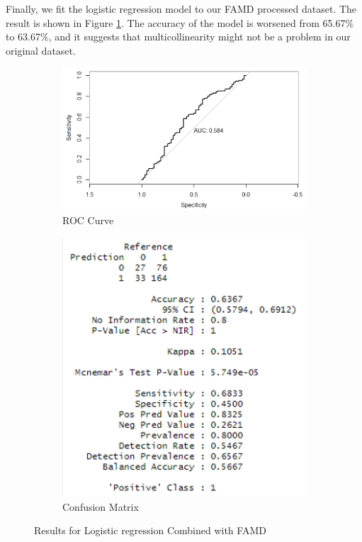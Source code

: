 \documentclass{jpp}
\begin{document}
Finally, we fit the logistic regression model to our FAMD processed dataset. The result is shown in Figure \ref{logistic_FAMD}. The accuracy of the model is worsened from 65.67\% to 63.67\%, and it suggests that multicollinearity might not be a problem in our original dataset.

\begin{figure}
\begin{subfigure}{.5\textwidth}
  \centering
  \includegraphics[width=.9\linewidth]{logistic_FAMD1.png}  
  \caption{ROC Curve}
\end{subfigure}
\begin{subfigure}{.5\textwidth}
  \centering
  \includegraphics[width=.9\linewidth]{logistic_FAMD2.png}  
  \caption{Confusion Matrix}
\end{subfigure}
\caption{Results for Logistic regression Combined with FAMD}
\label{logistic_FAMD}
\end{figure}
\end{document}
